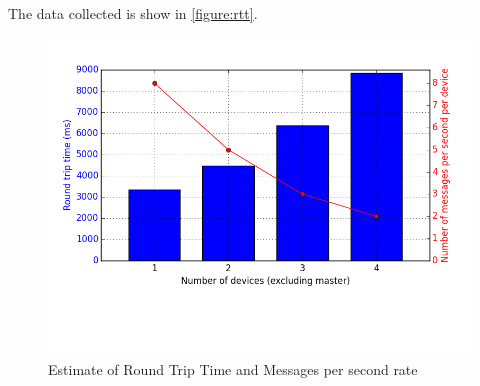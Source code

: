 The data collected is show in \ref{figure:rtt}.

\begin{figure}[ht!]
  \centering
  \includegraphics[width=1.0\textwidth]{img/messages_per_second.png} 
  \caption{Estimate of Round Trip Time and Messages per second rate}
  \label{figure:messages-per-second}
\end{figure}